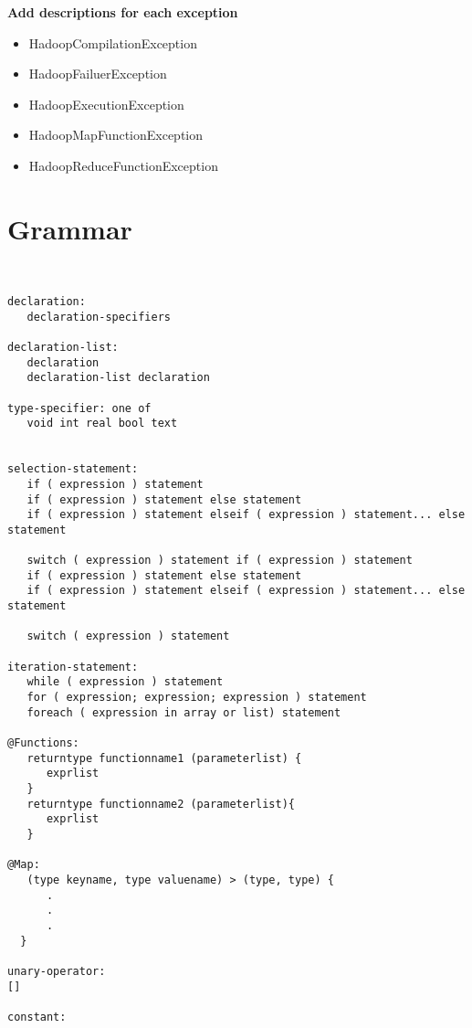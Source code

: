 \documentclass{book}
\begin{document}
\textbf{Add descriptions for each exception}

\begin{itemize}
  \item[] HadoopCompilationException
  \item[] HadoopFailuerException
  \item[] HadoopExecutionException
  \item[] HadoopMapFunctionException
  \item[] HadoopReduceFunctionException
\end{itemize}



\chapter{Grammar} %
\label{cha:grammar}

\begin{verbatim}


declaration:
   declaration-specifiers

declaration-list:
   declaration
   declaration-list declaration

type-specifier: one of
   void int real bool text


selection-statement:
   if ( expression ) statement
   if ( expression ) statement else statement
   if ( expression ) statement elseif ( expression ) statement... else statement

   switch ( expression ) statement if ( expression ) statement
   if ( expression ) statement else statement
   if ( expression ) statement elseif ( expression ) statement... else statement
 
   switch ( expression ) statement

iteration-statement:  
   while ( expression ) statement
   for ( expression; expression; expression ) statement
   foreach ( expression in array or list) statement

@Functions:
   return­type function­name­1 (parameter­list) {
      exprlist 
   }
   returntype functionname2 (parameterlist){
      exprlist
   }

@Map: 
   (type key­name, type value­name) ­> (type, type) {
      .
      .
      .
  }

unary-operator:
[]

constant:

\end{verbatim}

\end{document}
